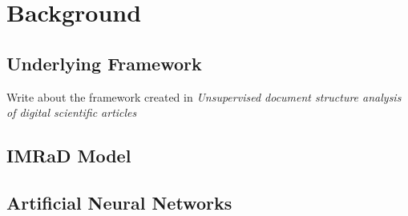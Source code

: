 \chapter{Background}
\label{cha:background}

\section{Underlying Framework}
\label{sec:underlying-framework}

Write about the framework created in \textit{Unsupervised document structure analysis of digital scientific articles}

\section{IMRaD Model}
\label{sec:imrad-model}

\section{Artificial Neural Networks}
\label{sec:artificial-neural-networks}